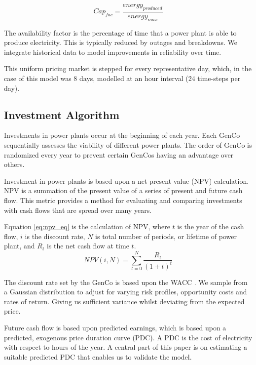 \documentclass[final,3p,times,twocolumn,numbers]{elsarticle}
\begin{document}
\begin{equation}
	Cap_{fac}=\frac{energy_{produced}}{energy_{max}}
\end{equation}

 The availability factor is the percentage of time that a power plant is able to produce electricity. This is typically reduced by outages and breakdowns. We integrate historical data to model improvements in reliability over time.
 
 This uniform pricing market is stepped for every representative day, which, in the case of this model was 8 days, modelled at an hour interval (24 time-steps per day). 
 
 \subsection{Investment Algorithm}
 
Investments in power plants occur at the beginning of each year. Each GenCo sequentially assesses the viability of different power plants. The order of GenCo is randomized every year to prevent certain GenCos having an advantage over others.

Investment in power plants is based upon a net present value (NPV) calculation. NPV is a summation of the present value of a series of present and future cash flow. This metric provides a method for evaluating and comparing investments with cash flows that are spread over many years. 

Equation \ref{eq:npv_eq} is the calculation of NPV, where $t$ is the year of the cash flow, $i$ is the discount rate, $N$ is total number of periods, or lifetime of power plant, and $R_t$ is the net cash flow at time $t$.
\begin{equation} \label{eq:npv_eq}
NPV(i, N) = \sum_{t=0}^{N}\frac{R_t}{(1+t)^t}
\end{equation}

The discount rate set by the GenCo is based upon the WACC \cite{KincheloeStephenC1990TWAC}. We sample from a Gaussian distribution to adjust for varying risk profiles, opportunity costs and rates of return. Giving us sufficient variance whilst deviating from the expected price.

Future cash flow is based upon predicted earnings, which is based upon a predicted, exogenous price duration curve (PDC). A PDC is the cost of electricity with respect to hours of the year. A central part of this paper is on estimating a suitable predicted PDC that enables us to validate the model.
\end{document}

